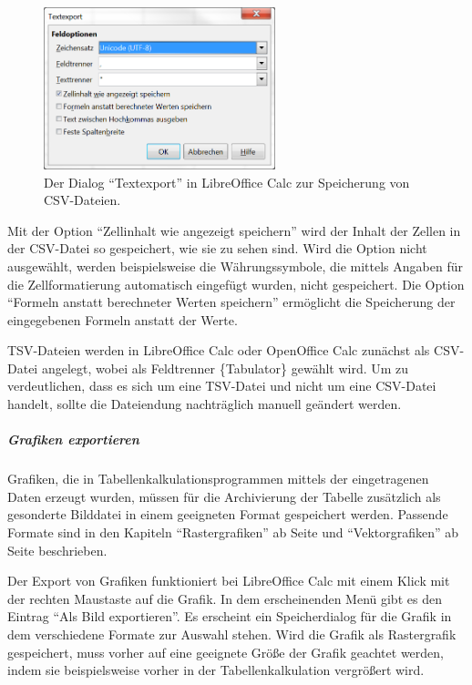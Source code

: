 \begin{figure}
\begin{center}
	\includegraphics[width=0.6\textwidth]{bilder/tabelle_calcCSV}
\end{center}
  \caption{Der Dialog "`Textexport"' in LibreOffice Calc zur Speicherung von CSV-Dateien.}
\label{abb:tabelle-calcCSV}
\end{figure}
Mit der Option "`Zellinhalt wie angezeigt speichern"' wird der Inhalt der Zellen in der CSV-Datei so gespeichert, wie sie zu sehen sind. Wird die Option nicht ausgewählt, werden beispielsweise die Währungssymbole, die mittels Angaben für die Zellformatierung automatisch eingefügt wurden, nicht gespeichert. Die Option "`Formeln anstatt berechneter Werten speichern"' ermöglicht die Speicherung der eingegebenen Formeln anstatt der Werte.

TSV-Dateien werden in LibreOffice Calc oder OpenOffice Calc zunächst als CSV-Datei angelegt, wobei als Feldtrenner \{Tabulator\} gewählt wird. Um zu verdeutlichen, dass es sich um eine TSV-Datei und nicht um eine CSV-Datei handelt, sollte die Dateiendung nachträglich manuell geändert werden.

\subparagraph{Grafiken exportieren}
Grafiken, die in Tabellenkalkulationsprogrammen mittels der eingetragenen Daten erzeugt wurden, müssen für die Archivierung der Tabelle zusätzlich als gesonderte Bilddatei in einem geeigneten Format gespeichert werden. Passende Formate sind in den Kapiteln "`Rastergrafiken"' ab Seite \pageref{rastergrafiken} und "`Vektorgrafiken"' ab Seite \pageref{vektorgrafiken} beschrieben.

Der Export von Grafiken funktioniert bei LibreOffice Calc mit einem Klick mit der rechten Maustaste auf die Grafik. In dem erscheinenden Menü gibt es den Eintrag "`Als Bild exportieren"'. Es erscheint ein Speicherdialog für die Grafik in dem verschiedene Formate zur Auswahl stehen. Wird die Grafik als Rastergrafik gespeichert, muss vorher auf eine geeignete Größe der Grafik geachtet werden, indem sie beispielsweise vorher in der Tabellenkalkulation vergrößert wird.

